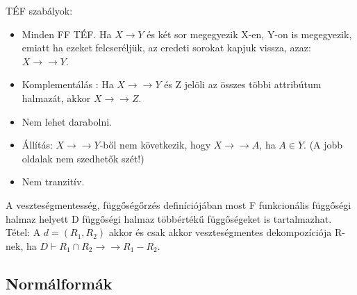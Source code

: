 \documentclass[margin=0px]{article}
\begin{document}
	TÉF szabályok:
	\begin{itemize}
		\item Minden FF TÉF. Ha $X \to Y$ és két sor megegyezik X-en, Y-on is megegyezik, emiatt ha ezeket felcseréljük, az eredeti sorokat kapjuk vissza, azaz: $X \to\to Y$.
		\item Komplementálás : Ha $X \to\to Y$ és Z jelöli az összes többi attribútum halmazát, akkor $X \to\to Z$.
		\item Nem lehet darabolni.
		\item Állítás: $X \to\to Y$-ből nem következik, hogy $X \to\to A$, ha $A \in Y$. (A jobb oldalak nem szedhetők szét!)
		\item Nem tranzitív.
	\end{itemize}
	A veszteségmentesség, függőségőrzés definíciójában most F funkcionális függőségi halmaz helyett D függőségi halmaz többértékű függőségeket is tartalmazhat. \\
	Tétel: A $d=(R_1,R_2)$ akkor és csak akkor veszteségmentes dekompozíciója R-nek, ha $D \vdash R_1 \cap R_2 \to\to R_1-R_2$.
	
	\subsection{Normálformák}
	
\end{document}
